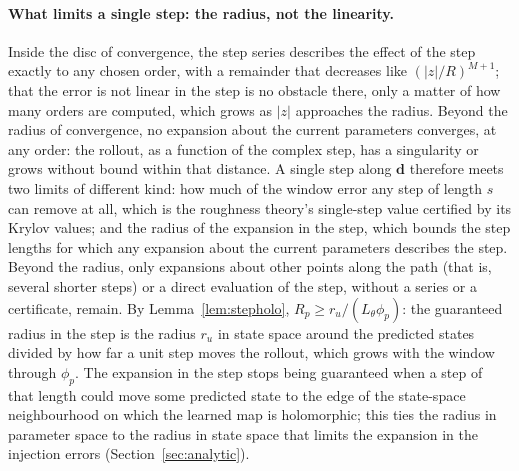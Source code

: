 \documentclass[11pt]{article}
\theoremstyle{definition}
\theoremstyle{remark}
\begin{document}
\paragraph{What limits a single step: the radius, not the linearity.}
Inside the disc of convergence, the step series describes the effect of the step exactly to any chosen order, with a remainder that decreases like $(|z|/R)^{M+1}$; that the error is not linear in the step is no obstacle there, only a matter of how many orders are computed, which grows as $|z|$ approaches the radius.
Beyond the radius of convergence, no expansion about the current parameters converges, at any order: the rollout, as a function of the complex step, has a singularity or grows without bound within that distance.
A single step along $\mathbf d$ therefore meets two limits of different kind: how much of the window error any step of length $s$ can remove at all, which is the roughness theory's single-step value certified by its Krylov values; and the radius of the expansion in the step, which bounds the step lengths for which any expansion about the current parameters describes the step.
Beyond the radius, only expansions about other points along the path (that is, several shorter steps) or a direct evaluation of the step, without a series or a certificate, remain.
By Lemma~\ref{lem:stepholo}, $R_p\ge r_u/(L_\theta\phi_p)$: the guaranteed radius in the step is the radius $r_u$ in state space around the predicted states divided by how far a unit step moves the rollout, which grows with the window through $\phi_p$. The expansion in the step stops being guaranteed when a step of that length could move some predicted state to the edge of the state-space neighbourhood on which the learned map is holomorphic; this ties the radius in parameter space to the radius in state space that limits the expansion in the injection errors (Section~\ref{sec:analytic}).
\end{document}
